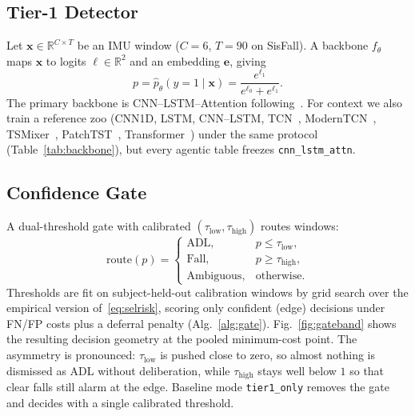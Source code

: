 \documentclass[journal]{IEEEtran}
\begin{document}


\subsection{Tier-1 Detector}
Let $\mathbf{x}\in\mathbb{R}^{C\times T}$ be an IMU window ($C{=}6$, $T{=}90$ on SisFall). A backbone $f_\theta$ maps $\mathbf{x}$ to logits $\boldsymbol{\ell}\in\mathbb{R}^{2}$ and an embedding $\mathbf{e}$, giving
\begin{equation}
p = \hat{p}_\theta(y{=}1\mid\mathbf{x}) = \frac{e^{\ell_1}}{e^{\ell_0}+e^{\ell_1}}.
\label{eq:pfall}
\end{equation}
The primary backbone is CNN--LSTM--Attention following~\cite{bhatti2025beyond}. For context we also train a reference zoo (CNN1D, LSTM, CNN--LSTM, TCN~\cite{bai2018tcn}, ModernTCN~\cite{iglesias2023modern}, TSMixer~\cite{tsmixer2023}, PatchTST~\cite{patchtst2023}, Transformer~\cite{vaswani2017attention}) under the same protocol (Table~\ref{tab:backbone}), but every agentic table freezes \texttt{cnn\_lstm\_attn}.

\subsection{Confidence Gate}
A dual-threshold gate with calibrated $(\tau_{\mathrm{low}},\tau_{\mathrm{high}})$ routes windows:
\begin{equation}
\mathrm{route}(p)=
\begin{cases}
\mathrm{ADL}, & p \le \tau_{\mathrm{low}},\\
\mathrm{Fall}, & p \ge \tau_{\mathrm{high}},\\
\mathrm{Ambiguous}, & \text{otherwise.}
\end{cases}
\label{eq:gate}
\end{equation}
Thresholds are fit on subject-held-out calibration windows by grid search over the empirical version of~\eqref{eq:selrisk}, scoring only confident (edge) decisions under FN/FP costs plus a deferral penalty (Alg.~\ref{alg:gate}). Fig.~\ref{fig:gateband} shows the resulting decision geometry at the pooled minimum-cost point. The asymmetry is pronounced: $\tau_{\mathrm{low}}$ is pushed close to zero, so almost nothing is dismissed as ADL without deliberation, while $\tau_{\mathrm{high}}$ stays well below $1$ so that clear falls still alarm at the edge. Baseline mode \texttt{tier1\_only} removes the gate and decides with a single calibrated threshold.
\end{document}
